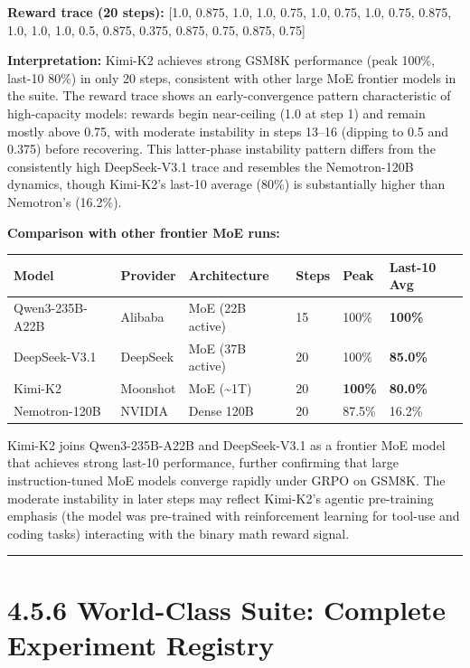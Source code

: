 \documentclass[
  american,
  11pt,
  a4paper,
  oneside]{report}
\newcounter{none} %
\begin{document}
\textbf{Reward trace (20 steps):} {[}1.0, 0.875, 1.0, 1.0, 0.75, 1.0,
0.75, 1.0, 0.75, 0.875, 1.0, 1.0, 1.0, 0.5, 0.875, 0.375, 0.875, 0.75,
0.875, 0.75{]}

\textbf{Interpretation:} Kimi-K2 achieves strong GSM8K performance (peak
100\%, last-10 80\%) in only 20 steps, consistent with other large MoE
frontier models in the suite. The reward trace shows an
early-convergence pattern characteristic of high-capacity models:
rewards begin near-ceiling (1.0 at step 1) and remain mostly above 0.75,
with moderate instability in steps 13--16 (dipping to 0.5 and 0.375)
before recovering. This latter-phase instability pattern differs from
the consistently high DeepSeek-V3.1 trace and resembles the
Nemotron-120B dynamics, though Kimi-K2's last-10 average (80\%) is
substantially higher than Nemotron's (16.2\%).

\textbf{Comparison with other frontier MoE runs:}

{\def\LTcaptype{none} %
\begin{longtable}[]{@{}llllll@{}}
\toprule\noalign{}
Model & Provider & Architecture & Steps & Peak & Last-10 Avg \\
\midrule\noalign{}
\endhead
\bottomrule\noalign{}
\endlastfoot
Qwen3-235B-A22B & Alibaba & MoE (22B active) & 15 & 100\% &
\textbf{100\%} \\
DeepSeek-V3.1 & DeepSeek & MoE (37B active) & 20 & 100\% &
\textbf{85.0\%} \\
Kimi-K2 & Moonshot & MoE (\textasciitilde1T) & 20 & \textbf{100\%} &
\textbf{80.0\%} \\
Nemotron-120B & NVIDIA & Dense 120B & 20 & 87.5\% & 16.2\% \\
\end{longtable}
}

Kimi-K2 joins Qwen3-235B-A22B and DeepSeek-V3.1 as a frontier MoE model
that achieves strong last-10 performance, further confirming that large
instruction-tuned MoE models converge rapidly under GRPO on GSM8K. The
moderate instability in later steps may reflect Kimi-K2's agentic
pre-training emphasis (the model was pre-trained with reinforcement
learning for tool-use and coding tasks) interacting with the binary math
reward signal.

\begin{center}\rule{0.5\linewidth}{0.5pt}\end{center}

\section{4.5.6 World-Class Suite: Complete Experiment
Registry}\label{world-class-suite-complete-experiment-registry}
\end{document}
